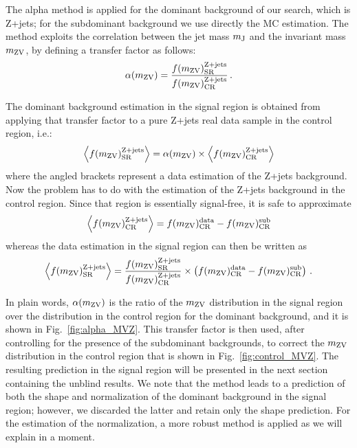 The alpha method is applied for the dominant background of our search, which is Z+jets; for the subdominant background we use directly the MC estimation. The method exploits the correlation between the jet mass $m_\mathrm{J}$ and the invariant mass $m_\mathrm{ZV}$, by defining a transfer factor as follows:
\begin{equation}
\alpha(m_\mathrm{ZV}) = \frac{f(m_\mathrm{ZV})^{\textrm{Z+jets}}_{\textrm{SR}}}{f(m_\mathrm{ZV})^{\textrm{Z+jets}}_{\textrm{CR}}}\,.
\end{equation}

The dominant background estimation in the signal region is obtained from applying that transfer factor to a pure Z+jets real data sample in the control region, i.e.:
\begin{equation}
\left \langle f(m_\mathrm{ZV})^{\textrm{Z+jets}}_{\textrm{SR}} \right \rangle = \alpha(m_\mathrm{ZV})
\times
\left \langle f(m_\mathrm{ZV})^{\textrm{Z+jets}}_{\textrm{CR}} \right \rangle
\end{equation}
where the angled brackets represent a data estimation of the Z+jets background. Now the problem has to do with the estimation of the Z+jets background in the control region. Since that region is essentially signal-free, it is safe to approximate
\begin{equation}
\left \langle f(m_\mathrm{ZV})^{\textrm{Z+jets}}_{\textrm{CR}} \right \rangle =
f(m_\mathrm{ZV})^{\textrm{data}}_{\textrm{CR}} - f(m_\mathrm{ZV})^{\textrm{sub}}_{\textrm{CR}}
\end{equation}
whereas the data estimation in the signal region can then be written as
\begin{equation}
\left \langle f(m_\mathrm{ZV})^{\textrm{Z+jets}}_{\textrm{SR}} \right \rangle
=
\frac{f(m_\mathrm{ZV})^{\textrm{Z+jets}}_{\textrm{SR}}}{f(m_\mathrm{ZV})^{\textrm{Z+jets}}_{\textrm{CR}}}
\times
\left (
f(m_\mathrm{ZV})^{\textrm{data}}_{\textrm{CR}} - f(m_\mathrm{ZV})^{\textrm{sub}}_{\textrm{CR}}
\right )\,.
\label{eq:domSR}
\end{equation}

In plain words, $\alpha(m_\mathrm{ZV})$ is the ratio of the $m_\mathrm{ZV}$ distribution in the signal region over the distribution in the control region for the dominant background, and it is shown in Fig.~\ref{fig:alpha_MVZ}. This transfer factor is then used, after controlling for the presence of the subdominant backgrounds, to correct the $m_\mathrm{ZV}$ distribution in the control region that is shown in Fig.~\ref{fig:control_MVZ}. The resulting prediction in the signal region will be presented in the next section containing the unblind results. We note that the method leads to a prediction of both the shape and normalization of the dominant background in the signal region; however, we discarded the latter and retain only the shape prediction. For the estimation of the normalization, a more robust method is applied as we will explain in a moment.

